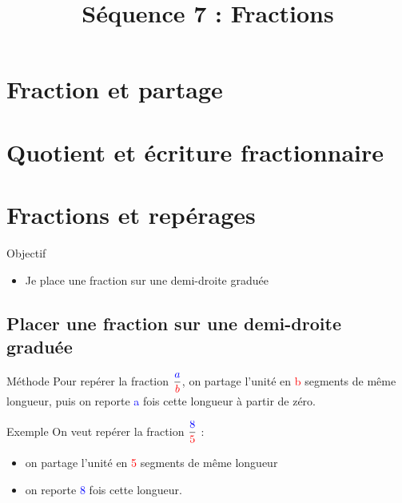 \documentclass[xcolor={dvipsnames}]{beamer}
\title{Séquence 7 : Fractions}
\begin{document}
\begin{frame}
  \titlepage 
\end{frame}

\section{Fraction et partage}
	
\section{Quotient et écriture fractionnaire}

\section{Fractions et repérages}

\begin{frame}
	\begin{block}{Objectif}
		\begin{itemize}
			\item Je place une fraction sur une demi-droite graduée
		\end{itemize}
	\end{block}
\end{frame}

\subsection{Placer une fraction sur une demi-droite graduée}

\begin{frame}
	\begin{block}{Méthode}
		Pour repérer la fraction $\dfrac{\textcolor{blue}{a}}{\textcolor{red}{b}}$, on partage l'unité en \textcolor{red}{b} segments de même longueur, puis on reporte \textcolor{blue}{a} fois cette longueur à partir de zéro.
	\end{block} \pause

	\begin{exampleblock}{Exemple}
		On veut repérer la fraction $\dfrac{\textcolor{blue}{8}}{\textcolor{red}{5}}$ :
		
		\begin{itemize}
			\item on partage l'unité en \textcolor{red}{5} segments de même longueur
			\item on reporte \textcolor{blue}{8} fois cette longueur.
		\end{itemize}
	\end{exampleblock}
\end{frame}
\end{document}
